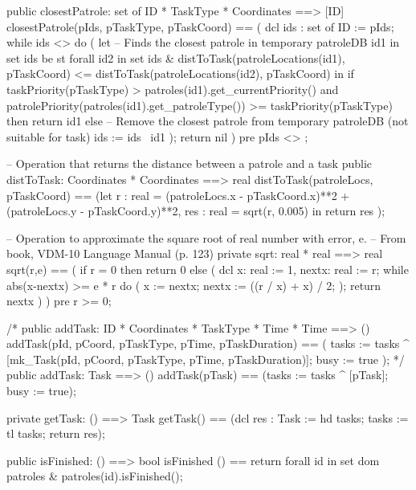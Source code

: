 \documentclass[a4paper]{article}
\begin{document}
\begin{vdm_al}
    
public closestPatrole: set of ID * TaskType * Coordinates ==> [ID]
closestPatrole(pIds, pTaskType, pTaskCoord) ==
(   
    dcl ids : set of ID := pIds;
    while ids <> {} do
    (
        let
            -- Finds the closest patrole in temporary patroleDB
            id1 in set ids be st forall id2 in set ids
            & distToTask(patroleLocations(id1), pTaskCoord) <= distToTask(patroleLocations(id2), pTaskCoord)
        in
            if 
                taskPriority(pTaskType) > patroles(id1).get_currentPriority() and 
                patrolePriority(patroles(id1).get_patroleType()) >= taskPriority(pTaskType)
            then
                return id1
            else
                -- Remove the closest patrole from temporary patroleDB (not suitable for task) 
                ids := ids \ {id1}
    );
    return nil
)
pre pIds <> {};
     
-- Operation that returns the distance between a patrole and a task
public distToTask: Coordinates * Coordinates ==> real
distToTask(patroleLocs, pTaskCoord) ==
(let
    r : real = (patroleLocs.x - pTaskCoord.x)**2 + (patroleLocs.y - pTaskCoord.y)**2,
    res : real = sqrt(r, 0.005) 
 in
    return res
);

    -- Operation to approximate the square root of real number with error, e.
    -- From book, VDM-10 Language Manual (p. 123) 
    private sqrt: real * real ==> real
    sqrt(r,e) ==
        (
            if r = 0
            then return 0
            else 
            (
                dcl x: real := 1,
                nextx: real := r;
                while abs(x-nextx) >= e * r  do
                    (
                        x := nextx;
                        nextx := ((r / x) + x) / 2;
                    );
                return nextx
            )
        )
    pre r >= 0;

    /* public addTask: ID * Coordinates * TaskType * Time * Time ==> ()
    addTask(pId, pCoord, pTaskType, pTime, pTaskDuration) ==
        (
            tasks := tasks ^ [mk_Task(pId, pCoord, pTaskType, pTime, pTaskDuration)];
            busy := true
        ); */
public addTask: Task ==> ()
addTask(pTask) ==
    (tasks := tasks ^ [pTask];
     busy := true);

private getTask: () ==> Task
getTask() ==
    (dcl res : Task := hd tasks;
     tasks := tl tasks;
     return res);

public isFinished: () ==> bool
isFinished () ==
    return forall id in set dom patroles & patroles(id).isFinished();


\end{vdm_al}
\end{document}
